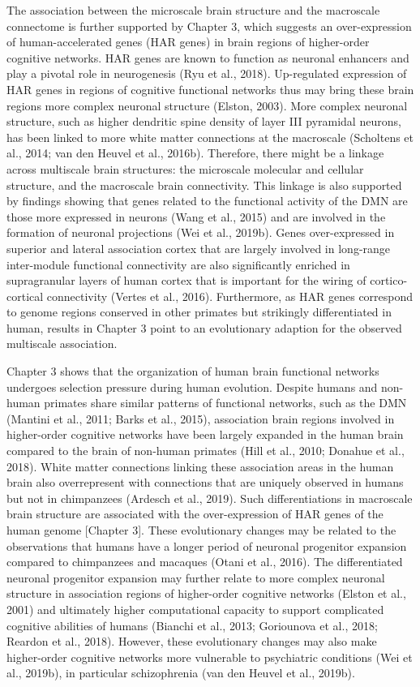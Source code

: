 \begin{refsection}
The association between the microscale brain structure and the macroscale connectome is further supported by Chapter 3, which suggests an over-expression of human-accelerated  genes (HAR genes) in brain regions of higher-order cognitive networks. HAR genes are known to function as neuronal enhancers and play a pivotal role in neurogenesis (Ryu et al., 2018). Up-regulated expression of HAR genes in regions of cognitive functional networks thus may bring these brain regions more complex neuronal structure (Elston, 2003). More complex neuronal structure, such as higher dendritic spine density of layer III pyramidal neurons, has been linked to more white matter connections at the macroscale (Scholtens et al., 2014; van den Heuvel et al., 2016b). Therefore, there might be a linkage across multiscale brain structures: the microscale molecular and cellular structure, and the macroscale brain connectivity. This linkage is also supported by findings showing that genes related to the functional activity of the DMN are those more expressed in neurons (Wang et al., 2015) and are involved in the formation of neuronal projections (Wei et al., 2019b). Genes over-expressed in superior and lateral association cortex that are largely involved in long-range inter-module functional connectivity are also significantly enriched in supragranular layers of human cortex that is important for the wiring of cortico-cortical connectivity (Vertes et al., 2016). Furthermore, as HAR genes correspond to genome regions conserved in other primates but strikingly differentiated in human, results in Chapter 3 point to an evolutionary adaption for the observed multiscale association.

Chapter 3 shows that the organization of human brain functional networks undergoes selection pressure during human evolution. Despite humans and non-human primates share similar patterns of functional networks, such as the DMN (Mantini et al., 2011; Barks et al., 2015), association brain regions involved in higher-order cognitive networks have been largely expanded in the human brain compared to the brain of non-human primates (Hill et al., 2010; Donahue et al., 2018). White matter connections linking these association areas in the human brain also overrepresent with connections that are uniquely observed in humans but not in chimpanzees (Ardesch et al., 2019). Such differentiations in macroscale brain structure are associated with the over-expression of HAR genes of the human genome [Chapter 3]. These evolutionary changes may be related to the observations that humans have a longer period of neuronal progenitor expansion compared to chimpanzees and macaques (Otani et al., 2016). The differentiated neuronal progenitor expansion may further relate to more complex neuronal structure in association regions of higher-order cognitive networks (Elston et al., 2001) and ultimately higher computational capacity to support complicated cognitive abilities of humans (Bianchi et al., 2013; Goriounova et al., 2018; Reardon et al., 2018). However, these evolutionary changes may also make higher-order cognitive networks more vulnerable to psychiatric conditions (Wei et al., 2019b), in particular schizophrenia (van den Heuvel et al., 2019b).


\end{refsection}
